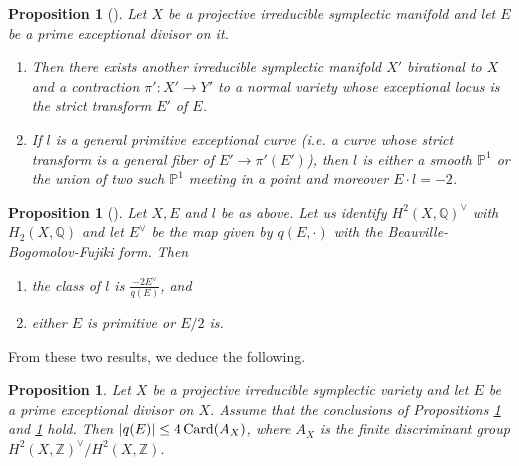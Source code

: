 \documentclass[12pt,reqno]{amsart}
\def\card{\mathop{\rm Card}\nolimits}
\newtheorem{prop}[thm]{Proposition}
\theoremstyle{plain}
\theoremstyle{definition}
\begin{document}
\begin{prop}[{\cite[Proposition 1.4 and Remark 4.3]{Druel}}]\label{prop:druel_prime}
Let $X$ be a projective irreducible symplectic manifold  and let $E$ be a prime exceptional divisor on it. 
\begin{enumerate}
\item[(i)] Then there exists another irreducible symplectic manifold $X'$ birational to $X$ and a contraction $\pi': X'\rightarrow Y'$ to a normal variety whose exceptional locus is the strict transform $E'$ of $E$. 
\item[(ii)] If $l$ is a  general primitive exceptional curve  (i.e. a curve whose strict transform is a general fiber of $E'\to \pi'(E')$), then $l$ is either a smooth $\mathbb{P}^1$ or the union of two such $\mathbb{P}^1$ meeting in a point and moreover $E\cdot l=-2$.
\end{enumerate}
\end{prop}
\begin{prop}[{\cite[Corollary 3.6 part 1 and 3]{markman}}]\label{prop:mark_prime}
Let $X,E$ and $l$ be as above. Let us identify $H^2(X,\mathbb{Q})^\vee$ with $H_2(X,\mathbb{Q})$ and let $E^\vee$ be the map given by $q(E,\cdot)$ with the Beauville-Bogomolov-Fujiki form. Then
\begin{enumerate}
\item[(i)] the class of $l$ is $\frac{-2E^\vee}{q(E)}$, and
\item[(ii)] either $E$ is primitive or $E/2$ is.
\end{enumerate}
\end{prop}
From these two results, we deduce the following.
\begin{prop}\label{prop:BNChk}
Let $X$ be a projective irreducible symplectic variety and let $E$ be a prime exceptional divisor on $X$. Assume that the conclusions of Propositions \ref{prop:druel_prime} and \ref{prop:mark_prime} hold.
Then $|q(E)|\leq 4\card(A_X)$, where $A_X$ is the finite discriminant group $H^2(X,\mathbb{Z})^\vee/H^2(X,\mathbb{Z})$. 
\end{prop}
\end{document}
